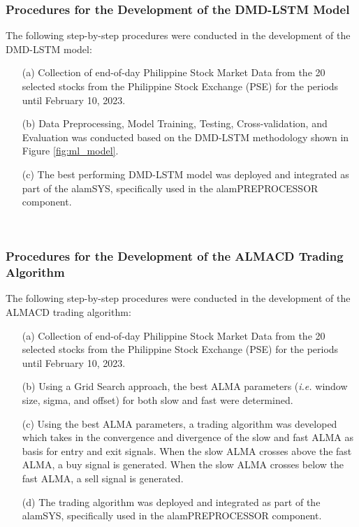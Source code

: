 \subsubsection{Procedures for the Development of the DMD-LSTM Model}
\label{subsubsec:proc_dmdlstm}
The following step-by-step procedures were conducted in the development
of the DMD-LSTM model:
\begin{itemize}
    \item[(a)] Collection of end-of-day Philippine Stock Market Data from the
    20 selected stocks from the Philippine Stock Exchange (PSE) for the periods
    until February 10, 2023.
    \item[(b)] Data Preprocessing, Model Training, Testing, Cross-validation, and Evaluation
    was conducted based on the DMD-LSTM methodology shown in Figure \ref{fig:ml_model}.
    \item[(c)] The best performing DMD-LSTM model was deployed and integrated as part 
    of the alamSYS, specifically used in the alamPREPROCESSOR component.
\end{itemize}
\hfill \\


\subsubsection{Procedures for the Development of the ALMACD Trading Algorithm}
\label{subsubsec:proc_almacd}
The following step-by-step procedures were conducted in the development
of the ALMACD trading algorithm:
\begin{itemize}
    \item[(a)] Collection of end-of-day Philippine Stock Market Data from the
    20 selected stocks from the Philippine Stock Exchange (PSE) for the periods
    until February 10, 2023.
    \item[(b)] Using a Grid Search approach, the best ALMA parameters 
    (\textit{i.e.} window size, sigma, and offset) for both slow and fast were
    determined.
    \item[(c)] Using the best ALMA parameters, a trading algorithm was developed
    which takes in the convergence and divergence of the slow and fast ALMA as basis
    for entry and exit signals. When the slow ALMA crosses above the fast ALMA, a
    buy signal is generated. When the slow ALMA crosses below the fast ALMA, a sell
    signal is generated.
    \item[(d)] The trading algorithm was deployed and integrated as part of the
    alamSYS, specifically used in the alamPREPROCESSOR component.
\end{itemize}
\hfill \\


